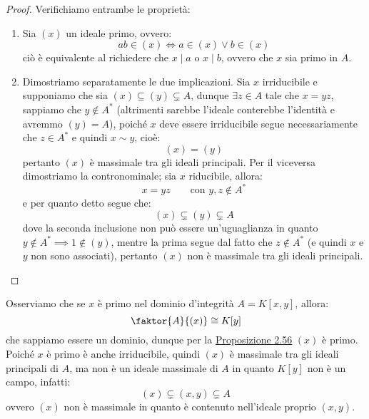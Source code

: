 \documentclass[11pt]{scrartcl}
\begin{document}
\begin{proof}
    Verifichiamo entrambe le proprietà:
    \begin{enumerate}[(1)]
        \item Sia $(x)$ un ideale primo, ovvero:
            \[ ab \in (x) \iff a \in (x) \vee b \in (x)
                \]
        ciò è equivalente al richiedere che $x \mid a$ o $x \mid b$, ovvero che $x$ sia primo in $A$.
        \item Dimostriamo separatamente le due implicazioni. Sia $x$ irriducibile e supponiamo che sia $(x) \subseteq (y) \subsetneq A$,
            dunque $\exists z \in A$ tale che $x = yz$, sappiamo che $y \not \in A^*$ (altrimenti sarebbe l'ideale conterebbe l'identità
            e avremmo $(y) = A$), poiché $x$ deve essere irriducibile segue necessariamente che $z \in A^*$ e quindi $x \sim y$, cioè:
            \[ (x) = (y)
                \]
            pertanto $(x)$ è massimale tra gli ideali principali. Per il viceversa dimostriamo la contronominale; sia $x$ riducibile, allora:
            \[ x = yz \qquad \text{con $y,z \not \in A^*$}
                \]
            e per quanto detto segue che:
            \[ (x) \subsetneq (y) \subsetneq A
                \]
            dove la seconda inclusione non può essere un'uguaglianza in quanto $y \not \in A^* \implies 1 \not \in (y)$, mentre la prima segue dal 
            fatto che $z \not \in A^*$ (e quindi $x$ e $y$ non sono associati), pertanto $(x)$ non è massimale tra gli ideali principali.
    \end{enumerate}
\end{proof}

\begin{example}
    Osserviamo che se $x$ è primo nel dominio d'integrità $A = K[x,y]$, allora:
    \[ \faktor{A}{(x)} \cong K[y]
        \]
    che sappiamo essere un dominio, dunque per la \hyperref[2.56]{Proposizione 2.56} $(x)$ è primo. Poiché $x$ è primo è anche irriducibile, quindi $(x)$
    è massimale tra gli ideali principali di $A$, ma non è un ideale massimale di $A$ in quanto $K[y]$ non è un campo, infatti:
    \[ (x) \subsetneq (x,y) \subsetneq A
        \]
    ovvero $(x)$ non è massimale in quanto è contenuto nell'ideale proprio $(x,y)$.
\end{example}

\newpage
\end{document}
